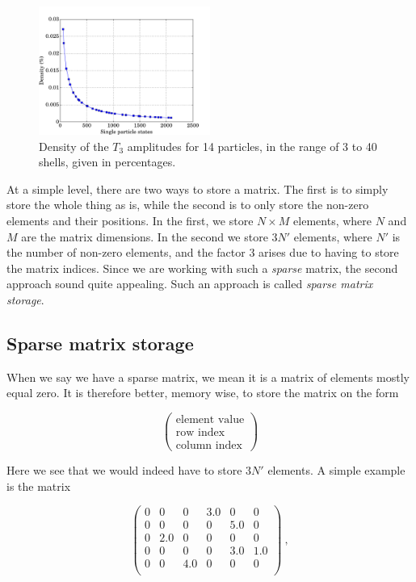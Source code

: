 \documentclass[10pt,twoside]{report}
\begin{document}
	\begin{figure}[h]
		\centering
		\captionsetup{width=.8\textwidth}
		\includegraphics[width=0.5\textwidth]{Figures/T3_density.pdf}
		\caption{Density of the $T_3$ amplitudes for 14 particles, in the range of 3 to 40 shells, given in percentages.}
		\label{Implementation | fig | "T3 density"}
	\end{figure}
	
	At a simple level, there are two ways to store a matrix. The first is to simply store the whole thing as is, while the second is to only store the non-zero elements and their positions. In the first, we store $N\times M$ elements, where $N$ and $M$ are the matrix dimensions. In the second we store $3N'$ elements, where $N'$ is the number of non-zero elements, and the factor 3 arises due to having to store the matrix indices. Since we are working with such a \emph{sparse} matrix, the second approach sound quite appealing. Such an approach is called \emph{sparse matrix storage}.
	
	\subsection{Sparse matrix storage}
	When we say we have a sparse matrix, we mean it is a matrix of elements mostly equal zero. It is therefore better, memory wise, to store the matrix on the form
	
	\begin{equation*}
		\begin{pmatrix}
			\text{element value} \\ \text{row index} \\ \text{column index}
		\end{pmatrix}
	\end{equation*}
	
	Here we see that we would indeed have to store $3N'$ elements. A simple example is the matrix
	
	\begin{equation*}
		\begin{pmatrix}
			0 & 0 & 0 & 3.0 & 0 & 0 \\
			0 & 0 & 0 & 0 & 5.0 & 0 \\
			0 & 2.0 & 0 & 0 & 0 & 0 \\
			0 & 0 & 0 & 0 & 3.0 & 1.0 \\
			0 & 0 & 4.0 & 0 & 0 & 0 \\
		\end{pmatrix} \:,
	\end{equation*}
	
\end{document}
